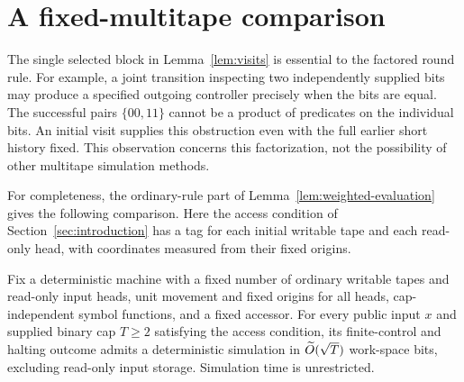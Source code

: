 \section{A fixed-multitape comparison}
\label{sec:multitape}

The single selected block in Lemma~\ref{lem:visits} is essential to
the factored round rule. For example, a joint transition inspecting
two independently supplied bits may produce a specified outgoing
controller precisely when the bits are equal. The successful pairs
\(\{00,11\}\) cannot be a product of predicates on the individual
bits. An initial visit supplies this obstruction even with the full
earlier short history fixed.
This observation concerns this factorization, not the possibility
of other multitape simulation methods.

For completeness, the ordinary-rule part of
Lemma~\ref{lem:weighted-evaluation} gives the following comparison.
Here the access condition of Section~\ref{sec:introduction} has a tag
for each initial writable tape and each read-only head, with coordinates
measured from their fixed origins.

\begin{proposition}
\label{prop:multitape}
Fix a deterministic machine with a fixed number of ordinary writable
tapes and read-only input heads, unit movement and fixed origins for
all heads, cap-independent symbol functions, and a fixed accessor.
For every public input \(x\) and supplied binary cap \(T\ge2\) satisfying
the access condition, its finite-control and halting outcome admits a
deterministic simulation
in \(\widetilde O(\sqrt T)\) work-space bits, excluding read-only input storage.
Simulation time is unrestricted.
\end{proposition}

